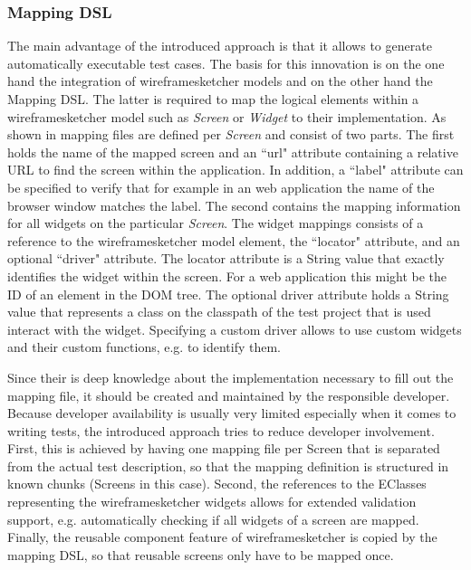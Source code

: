 \documentclass{sig-alternate-05-2015}
\begin{document}
\subsubsection{Mapping DSL}
The main advantage of the introduced approach is that it allows to generate automatically executable test cases.
The basis for this innovation is on the one hand the integration of wireframesketcher models and on the other hand the Mapping DSL.
The latter is required to map the logical elements within a wireframesketcher model such as \textit{Screen} or \textit{Widget} to their implementation.
As shown in  mapping files are defined per \textit{Screen} and consist of two parts.
The first holds the name of the mapped screen and an ``url" attribute containing a relative URL to find the screen within the application.
In addition, a ``label" attribute can be specified to verify that for example in an web application the name of the browser window matches the label.
The second contains the mapping information for all widgets on the particular \textit{Screen}.
The widget mappings consists of a reference to the wireframesketcher model element, the ``locator" attribute, and an optional ``driver" attribute.
The locator attribute is a String value that exactly identifies the widget within the screen.
For a web application this might be the ID of an element in the DOM tree.
The optional driver attribute holds a String value that represents a class on the classpath of the test project that is used interact with the widget.
Specifying a custom driver allows to use custom widgets and their custom functions, e.g. to identify them.

Since their is deep knowledge about the implementation necessary to fill out the mapping file, it should be created and maintained by the responsible developer. 
Because developer availability is usually very limited especially when it comes to writing tests, the introduced approach tries to reduce developer involvement.
First, this is achieved by having one mapping file per Screen that is separated from the actual test description, so that the mapping definition is structured in known chunks (Screens in this case). 
Second, the references to the EClasses representing the wireframesketcher widgets allows for extended validation support, e.g. automatically checking if all widgets of a screen are mapped.
Finally, the reusable component feature of wireframesketcher is copied by the mapping DSL, so that reusable screens only have to be mapped once.
\end{document}
